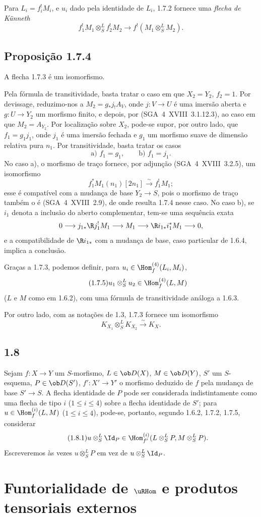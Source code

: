 Para $L_i=f_i^{!}M_i$, e $u_i$ dado pela identidade de $L_i$, 1.7.2 fornece uma \emph{flecha de Künneth}
\begin{equation}\tag{1.7.3}
f_1^{!}M_1\otimes^{L}_{S}f_2^{!}M_2\longrightarrow f^{!}(M_1\otimes^{L}_{S}M_2).
\end{equation}

\subsection*{Proposição 1.7.4}
A flecha 1.7.3 é um isomorfismo.

Pela fórmula de transitividade, basta tratar o caso em que $X_2=Y_2$, $f_2=1$. Por devissage, reduzimo-nos a $M_2=g_{*}j_{!}A_V$, onde $j:V\to U$ é uma imersão aberta e $g:U\to Y_2$ um morfismo finito, e depois, por (SGA~4~XVIII~3.1.12.3), ao caso em que $M_2=A_{Y_2}$. Por localização sobre $X_2$, pode-se supor, por outro lado, que $f_1=g_1j_1$, onde $j_1$ é uma imersão fechada e $g_1$ um morfismo suave de dimensão relativa pura $n_1$. Por transitividade, basta tratar os casos
\[
\text{a) } f_1=g_1,\qquad \text{b) } f_1=j_1.
\]
No caso a), o morfismo de traço fornece, por adjunção (SGA~4~XVIII~3.2.5), um isomorfismo
\[
f_1^{*}M_1(n_1)[2n_1]\xrightarrow{\sim}f_1^{!}M_1;
\]
esse é compatível com a mudança de base $Y_2\to S$, pois o morfismo de traço também o é (SGA~4~XVIII~2.9), de onde resulta 1.7.4 nesse caso. No caso b), se $i_1$ denota a inclusão do aberto complementar, tem-se uma sequência exata
\[
0\longrightarrow j_{1*}\R j_1^{!}M_1\longrightarrow M_1\longrightarrow \R i_{1*}i_1^{*}M_1\longrightarrow0,
\]
e a compatibilidade de $\R i_{1*}$ com a mudança de base, caso particular de 1.6.4, implica a conclusão.

Graças a 1.7.3, podemos definir, para $u_i\in\Hom_f^{(4)}(L_i,M_i)$,
\begin{equation}\tag{1.7.5}
u_1\otimes^{L}_{S}u_2\in\Hom_f^{(4)}(L,M)
\end{equation}
($L$ e $M$ como em 1.6.2), com uma fórmula de transitividade análoga a 1.6.3.

Por outro lado, com as notações de 1.3, 1.7.3 fornece um isomorfismo
\begin{equation}\tag{1.7.6}
K_{X_1}\otimes^{L}_{S}K_{X_2}\xrightarrow{\sim}K_X.
\end{equation}

\subsection*{1.8}
Sejam $f:X\to Y$ um $S$-morfismo, $L\in\ob D(X)$, $M\in\ob D(Y)$, $S'$ um $S$-esquema, $P\in\ob D(S')$, $f':X'\to Y'$ o morfismo deduzido de $f$ pela mudança de base $S'\to S$. A flecha identidade de $P$ pode ser considerada indistintamente como uma flecha de tipo $i$ ($1\leq i\leq4$) sobre a flecha identidade de $S'$; para $u\in\Hom_f^{(i)}(L,M)$ ($1\leq i\leq4$), pode-se, portanto, segundo 1.6.2, 1.7.2, 1.7.5, considerar
\begin{equation}\tag{1.8.1}
u\otimes^{L}_{S}\Id_P\in\Hom_{f'}^{(i)}(L\otimes^{L}_{S}P,M\otimes^{L}_{S}P).
\end{equation}
Escreveremos às vezes $u\otimes^{L}_{S}P$ em vez de $u\otimes^{L}_{S}\Id_P$.

\section{Funtorialidade de \texorpdfstring{$\uRHom$}{RHom} e produtos tensoriais externos}
